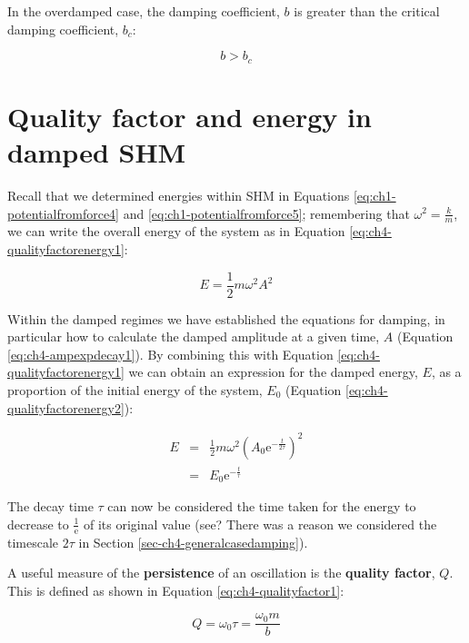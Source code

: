 \documentclass[
]{book}
\begin{document}
In the overdamped case, the damping coefficient, \(b\) is greater than the critical damping coefficient, \(b_c\):

\begin{equation}
b > b_c
\end{equation}

\hypertarget{sec-ch4-qualityfactor}{%
\section{Quality factor and energy in damped SHM}\label{sec-ch4-qualityfactor}}

Recall that we determined energies within SHM in Equations \eqref{eq:ch1-potentialfromforce4} and \eqref{eq:ch1-potentialfromforce5}; remembering that \(\omega^2 = \frac{k}{m}\), we can write the overall energy of the system as in Equation \eqref{eq:ch4-qualityfactorenergy1}:

\begin{equation}
E = \frac{1}{2}m\omega^2 A^2
\label{eq:ch4-qualityfactorenergy1}
\end{equation}

Within the damped regimes we have established the equations for damping, in particular how to calculate the damped amplitude at a given time, \(A\) (Equation \eqref{eq:ch4-ampexpdecay1}). By combining this with Equation \eqref{eq:ch4-qualityfactorenergy1} we can obtain an expression for the damped energy, \(E\), as a proportion of the initial energy of the system, \(E_0\) (Equation \eqref{eq:ch4-qualityfactorenergy2}):

\begin{equation}
\begin{array}{rcl}
E &=& \frac{1}{2}m\omega^2 \left( A_0 \mathrm{e}^{-\frac{t}{2\tau}} \right)^2\\
 &=& E_0 \mathrm{e}^{-\frac{t}{\tau}}
\end{array}
\label{eq:ch4-qualityfactorenergy2}
\end{equation}

The decay time \(\tau\) can now be considered the time taken for the energy to decrease to \(\frac{1}{\mathrm{e}}\) of its original value (see? There was a reason we considered the timescale \(2\tau\) in Section \ref{sec-ch4-generalcasedamping}).

A useful measure of the \textbf{persistence} of an oscillation is the \textbf{quality factor}, \(Q\). This is defined as shown in Equation \eqref{eq:ch4-qualityfactor1}:

\begin{equation}
Q = \omega_0 \tau = \frac{\omega_0 m}{b}
\label{eq:ch4-qualityfactor1}
\end{equation}
\end{document}
